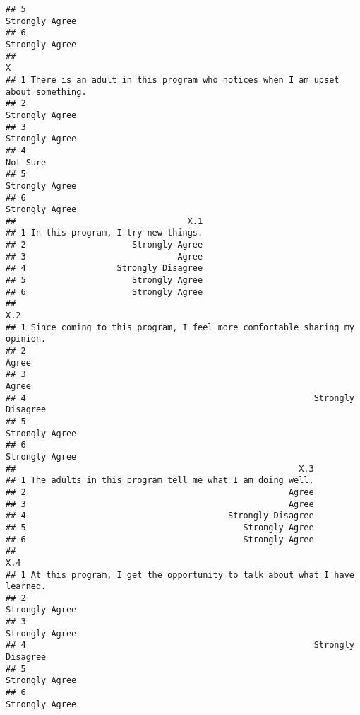 \documentclass[
]{article}
\begin{document}
\begin{verbatim}
## 5                                                                                               Strongly Agree
## 6                                                                                               Strongly Agree
##                                                                                X
## 1 There is an adult in this program who notices when I am upset about something.
## 2                                                                 Strongly Agree
## 3                                                                 Strongly Agree
## 4                                                                       Not Sure
## 5                                                                 Strongly Agree
## 6                                                                 Strongly Agree
##                                  X.1
## 1 In this program, I try new things.
## 2                     Strongly Agree
## 3                              Agree
## 4                  Strongly Disagree
## 5                     Strongly Agree
## 6                     Strongly Agree
##                                                                         X.2
## 1 Since coming to this program, I feel more comfortable sharing my opinion.
## 2                                                                     Agree
## 3                                                                     Agree
## 4                                                         Strongly Disagree
## 5                                                            Strongly Agree
## 6                                                            Strongly Agree
##                                                        X.3
## 1 The adults in this program tell me what I am doing well.
## 2                                                    Agree
## 3                                                    Agree
## 4                                        Strongly Disagree
## 5                                           Strongly Agree
## 6                                           Strongly Agree
##                                                                         X.4
## 1 At this program, I get the opportunity to talk about what I have learned.
## 2                                                            Strongly Agree
## 3                                                            Strongly Agree
## 4                                                         Strongly Disagree
## 5                                                            Strongly Agree
## 6                                                            Strongly Agree

\end{verbatim}
\end{document}
